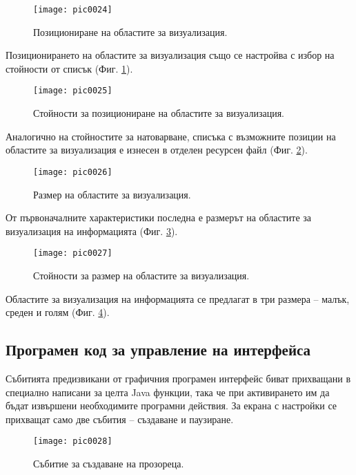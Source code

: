 \begin{figure}[h]
  \centering
  \texttt{[image: pic0024]}
  \caption{Позициониране на областите за визуализация.}
\label{fig:pic0024}
\end{figure}
\FloatBarrier

Позиционирането на областите за визуализация също се настройва с избор на стойности от списък (Фиг. \ref{fig:pic0024}). 

\begin{figure}[h]
  \centering
  \texttt{[image: pic0025]}
  \caption{Стойности за позициониране на областите за визуализация.}
\label{fig:pic0025}
\end{figure}
\FloatBarrier

Аналогично на стойностите за натоварване, списъка с възможните позиции на областите за визуализация е изнесен в отделен ресурсен файл (Фиг. \ref{fig:pic0025}). 

\begin{figure}[h]
  \centering
  \texttt{[image: pic0026]}
  \caption{Размер на областите за визуализация.}
\label{fig:pic0026}
\end{figure}
\FloatBarrier

От първоначалните характеристики последна е размерът на областите за визуализация на информацията (Фиг. \ref{fig:pic0026}). 

\begin{figure}[h]
  \centering
  \texttt{[image: pic0027]}
  \caption{Стойности за размер на областите за визуализация.}
\label{fig:pic0027}
\end{figure}
\FloatBarrier

Областите за визуализация на информацията се предлагат в три размера – малък, среден и голям (Фиг. \ref{fig:pic0027}).

\subsection{Програмен код за управление на интерфейса}

Събитията предизвикани от графичния програмен интерфейс биват прихващани в специално написани за целта Java функции, така че при активирането им да бъдат извършени необходимите програмни действия. За екрана с настройки се прихващат само две събития – създаване и паузиране. 

\begin{figure}[h]
  \centering
  \texttt{[image: pic0028]}
  \caption{Събитие за създаване на прозореца.}
\label{fig:pic0028}
\end{figure}
\FloatBarrier

